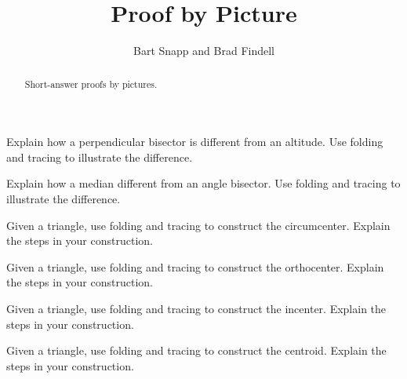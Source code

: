 \documentclass[nooutcomes]{ximera}
\title{Proof by Picture}
\author{Bart Snapp and Brad Findell}
\begin{document}
\begin{abstract}
Short-answer proofs by pictures. 
\end{abstract}
\maketitle



\begin{problem}
Explain how a perpendicular bisector is different from an
  altitude. Use folding and tracing to illustrate the difference.
\end{problem}

\begin{problem}
Explain how a median different from an angle bisector.  Use
  folding and tracing to illustrate the difference.
\end{problem}

\begin{problem}
Given a triangle, use folding and tracing to construct the
  circumcenter. Explain the steps in your
  construction.
\end{problem}

\begin{problem}
Given a triangle, use folding and tracing to construct the
  orthocenter. Explain the steps in your
  construction.
\end{problem}

\begin{problem}
Given a triangle, use folding and tracing to construct the incenter. Explain
  the steps in your construction.
\end{problem}

\begin{problem}
Given a triangle, use folding and tracing to construct the centroid. Explain
  the steps in your construction.
\end{problem}
\end{document}
